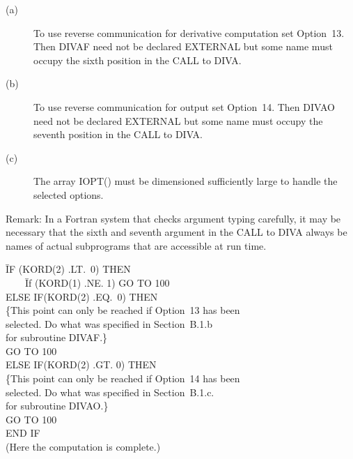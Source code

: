 \documentclass[twoside]{MATH77}
\begin{document}
\begin{description}
\item[\rm (a)]  To use reverse communication for derivative computation set
Option~13. Then DIVAF need not be declared EXTERNAL but some name must
occupy the sixth position in the CALL to DIVA.

\item[\rm (b)]  To use reverse communication for output set Option~14. Then
DIVAO need not be declared EXTERNAL but some name must occupy the seventh
position in the CALL to DIVA.

\item[\rm (c)]  The array IOPT() must be dimensioned sufficiently large to
handle the selected options.
\end{description}

Remark: In a Fortran system that checks argument typing carefully, it may be
necessary that the sixth and seventh argument in the CALL to DIVA always be
names of actual subprograms that are accessible at run time.

\begin{tabbing}
\phantom{100 }\=IF (KORD(2) .LT.\ 0) THEN\\
\>\ \ \ \ \=If (KORD(1) .NE. 1) GO TO 100\\
\>ELSE IF(KORD(2) .EQ.\ 0) THEN\\
\{This point can only be reached if Option~13 has been\\
\>selected. Do what was specified in Section\ B.1.b\\
\>for subroutine DIVAF.\}\\
\>\>GO TO 100\\
\>ELSE IF(KORD(2) .GT. 0) THEN\\
\{This point can only be reached if Option~14 has been\\
\>selected. Do what was specified in Section\ B.1.c.\\
\>for subroutine DIVAO.\}\\
\>\>GO TO 100\\
\>END IF\\
\>(Here the computation is complete.)
\end{tabbing}
\end{document}
